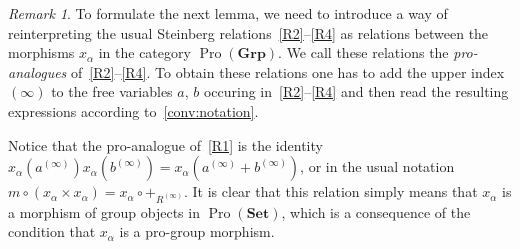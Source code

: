 \documentclass[oneside, 11pt]{amsart}
\numberwithin{equation}{section}
\theoremstyle{definition}
\theoremstyle{remark}
\newtheorem{rem}[lemma]{Remark}
\DeclareMathOperator{\Pro}{Pro}
\newcommand{\Set}{\mathbf{Set}}
\newcommand{\Group}{\mathbf{Grp}}
\begin{document}
\begin{rem}
 To formulate the next lemma, we need to introduce a way of reinterpreting the usual Steinberg relations~\eqref{R2}--\eqref{R4} as relations between the morphisms $x_\alpha$ in the category $\Pro(\Group)$. We call these relations the {\it pro-analogues} of~\eqref{R2}--\eqref{R4}. To obtain these relations one has to add the upper index $(\infty)$ to the free variables $a$, $b$ occuring in~\eqref{R2}--\eqref{R4} and then read the resulting expressions according to~\cref{conv:notation}. 
 
 Notice that the pro-analogue of~\eqref{R1} is the identity $x_\alpha(a^{(\infty)}) x_\alpha(b^{(\infty)}) = x_\alpha(a^{(\infty)} + b^{(\infty)})$, or in the usual notation $m \circ (x_\alpha \times x_\alpha) = x_\alpha \circ +_{R^{(\infty)}}$. It is clear that this relation simply means that $x_\alpha$ is a morphism of group objects in $\Pro(\Set)$, which is a consequence of the condition that $x_\alpha$ is a pro-group morphism.
\end{rem}
\end{document}
